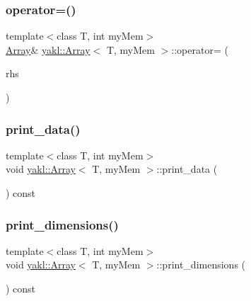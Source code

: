 \mbox{\label{classyakl_1_1Array_a3fa976a468678ca9574f22dd00a2246c}} 
\subsubsection{\texorpdfstring{operator=()}{operator=()}\hspace{0.1cm}{\footnotesize\ttfamily [2/2]}}
{\footnotesize\ttfamily template$<$class T, int my\+Mem$>$ \\
\hyperlink{classyakl_1_1Array}{Array}\& \hyperlink{classyakl_1_1Array}{yakl\+::\+Array}$<$ T, my\+Mem $>$\+::operator= (\begin{DoxyParamCaption}\item[{\hyperlink{classyakl_1_1Array}{Array}$<$ T, my\+Mem $>$ \&\&}]{rhs }\end{DoxyParamCaption})\hspace{0.3cm}{\ttfamily [inline]}}

\mbox{\label{classyakl_1_1Array_ab2c110e45f00e277afe6438fb20e230d}} 
\subsubsection{\texorpdfstring{print\+\_\+data()}{print\_data()}}
{\footnotesize\ttfamily template$<$class T, int my\+Mem$>$ \\
void \hyperlink{classyakl_1_1Array}{yakl\+::\+Array}$<$ T, my\+Mem $>$\+::print\+\_\+data (\begin{DoxyParamCaption}{ }\end{DoxyParamCaption}) const\hspace{0.3cm}{\ttfamily [inline]}}

\mbox{\label{classyakl_1_1Array_a4de9e24164b62fde2bb923016e1fa1d1}} 
\subsubsection{\texorpdfstring{print\+\_\+dimensions()}{print\_dimensions()}}
{\footnotesize\ttfamily template$<$class T, int my\+Mem$>$ \\
void \hyperlink{classyakl_1_1Array}{yakl\+::\+Array}$<$ T, my\+Mem $>$\+::print\+\_\+dimensions (\begin{DoxyParamCaption}{ }\end{DoxyParamCaption}) const\hspace{0.3cm}{\ttfamily [inline]}}

